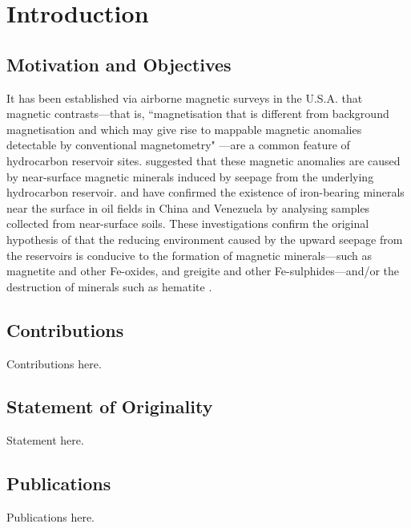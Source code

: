 
\chapter{Introduction}

\section{Motivation and Objectives}

It has been established via airborne magnetic surveys in the U.S.A. \citep{Donovan} that magnetic contrasts---that is, ``magnetisation that is different from background magnetisation and which may give rise to mappable magnetic anomalies detectable by conventional magnetometry" \citep{Machel}---are a common feature of hydrocarbon reservoir sites. \citet{Donovan} suggested that these magnetic anomalies are caused by near-surface magnetic minerals induced by seepage from the underlying hydrocarbon reservoir. \citet{Diaz} and \citet{Liu} have confirmed the existence of iron-bearing minerals near the surface in oil fields in China and Venezuela by analysing samples collected from near-surface soils. These investigations confirm the original hypothesis of \citet{Donovan} that the reducing environment caused by the upward seepage from the reservoirs is conducive to the formation of magnetic minerals---such as magnetite and other Fe-oxides, and greigite and other Fe-sulphides---and/or the destruction of minerals such as hematite \citep{Machel}.



\section{Contributions}

Contributions here.


\section{Statement of Originality}

Statement here.


\section{Publications}

Publications here.
